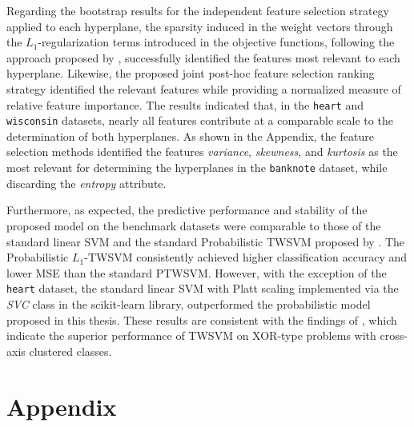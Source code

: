 \documentclass[12pt]{report} %
\begin{document}
Regarding the bootstrap results for the independent feature selection strategy applied to each hyperplane, the sparsity induced in the weight vectors through the $L_1$-regularization terms introduced in the objective functions, following the approach proposed by \cite{bai2014novel}, successfully identified the features most relevant to each hyperplane. Likewise, the proposed joint post-hoc feature selection ranking strategy identified the relevant features while providing a normalized measure of relative feature importance. The results indicated that, in the \texttt{heart} and \texttt{wisconsin} datasets, nearly all features contribute at a comparable scale to the determination of both hyperplanes. As shown in the Appendix, the feature selection methods identified the features \textit{variance}, \textit{skewness}, and \textit{kurtosis} as the most relevant for determining the hyperplanes in the \texttt{banknote} dataset, while discarding the \textit{entropy} attribute.

Furthermore, as expected, the predictive performance and stability of the proposed model on the benchmark datasets were comparable to those of the standard linear SVM and the standard Probabilistic TWSVM proposed by \cite{shao2012probabilistic}. The Probabilistic $L_1$-TWSVM consistently achieved higher classification accuracy and lower MSE than the standard PTWSVM. However, with the exception of the \texttt{heart} dataset, the standard linear SVM with Platt scaling implemented via the \textit{SVC} class in the scikit-learn library, outperformed the probabilistic model proposed in this thesis. These results are consistent with the findings of \cite{khemchandani2007twin}, which indicate the superior performance of TWSVM on XOR-type problems with cross-axis clustered classes.




\clearpage
{}

\printbibliography




\chapter* {Appendix}
\end{document}
